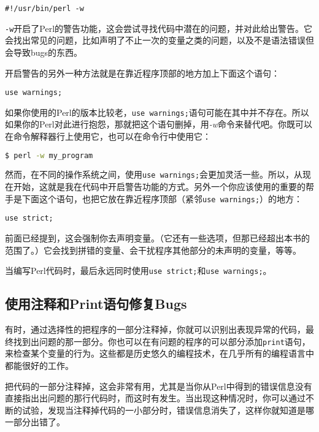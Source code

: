 \begin{lstlisting}
#!/usr/bin/perl -w
\end{lstlisting}

\verb|-w|开启了Perl的警告功能，这会尝试寻找代码中潜在的问题，并对此给出警告。它会找出常见的问题，比如声明了不止一次的变量之类的问题，以及不是语法错误但会导致bugs的东西。

开启警告的另外一种方法就是在靠近程序顶部的地方加上下面这个语句：

\begin{lstlisting}
use warnings;
\end{lstlisting}

如果你使用的Perl的版本比较老，\verb|use warnings;|语句可能在其中并不存在。所以如果你的Perl对此进行抱怨，那就把这个语句删掉，用\textit{-w}命令来替代吧。你既可以在命令解释器行上使用它，也可以在命令行中使用它：

\begin{lstlisting}[language=bash]
$ perl -w my_program
\end{lstlisting}

然而，在不同的操作系统之间，使用\verb|use warnings;|会更加灵活一些。所以，从现在开始，这就是我在代码中开启警告功能的方式。另外一个你应该使用的重要的帮手是下面这个语句，也把它放在靠近程序顶部（紧邻\verb|use warnings;|）的地方：

\begin{lstlisting}
use strict;
\end{lstlisting}

前面已经提到，这会强制你去声明变量。（它还有一些选项，但那已经超出本书的范围了。）它会找到拼错的变量、会干扰程序其他部分的未声明的变量，等等。

\begin{adjustwidth}{2cm}{2cm}
  \noindent
当编写Perl代码时，最后永远同时使用\verb|use strict;|和\verb|use warnings;|。
\end{adjustwidth}

\subsection{使用注释和Print语句修复Bugs}
有时，通过选择性的把程序的一部分注释掉，你就可以识别出表现异常的代码，最终找到出问题的那一部分。你也可以在有问题的程序的可以部分添加\verb|print|语句，来检查某个变量的行为。这些都是历史悠久的编程技术，在几乎所有的编程语言中都能很好的工作。

把代码的一部分注释掉，这会非常有用，尤其是当你从Perl中得到的错误信息没有直接指出出问题的那行代码时，而这时有发生。当出现这种情况时，你可以通过不断的试验，发现当注释掉代码的一小部分时，错误信息消失了，这样你就知道是哪一部分出错了。

